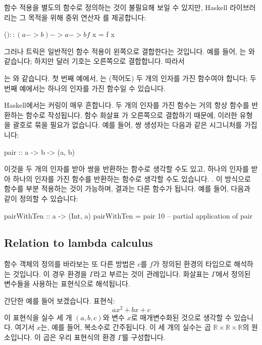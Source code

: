 \documentclass[DaoFP]{subfiles}
\begin{document}
\begin{CJK*}{UTF8}{gbsn}
함수 적용을 별도의 함수로 정의하는 것이 불필요해 보일 수 있지만, Haskell 라이브러리는 그 목적을 위해 중위 연산자 \hask{$}를 제공합니다:
\begin{haskell}
($) :: (a -> b) -> a -> b
f $ x = f x
\end{haskell}
그러나 트릭은 일반적인 함수 적용이 왼쪽으로 결합한다는 것입니다. 예를 들어, 는 와 같습니다; 하지만 달러 기호는 오른쪽으로 결합합니다. 따라서
는 와 같습니다. 첫 번째 예에서, 는 (적어도) 두 개의 인자를 가진 함수여야 합니다; 두 번째 예에서는 하나의 인자를 가진 함수일 수 있습니다.

Haskell에서는 커링이 매우 흔합니다. 두 개의 인자를 가진 함수는 거의 항상 함수를 반환하는 함수로 작성됩니다. 함수 화살표 \hask{->}가 오른쪽으로 결합하기 때문에, 이러한 유형을 괄호로 묶을 필요가 없습니다. 예를 들어, 쌍 생성자는 다음과 같은 시그니처를 가집니다:
\begin{haskell}
pair :: a -> b -> (a, b)
\end{haskell}
이것을 두 개의 인자를 받아 쌍을 반환하는 함수로 생각할 수도 있고, 하나의 인자를 받아 하나의 인자를 가진 함수를 반환하는 함수로 생각할 수도 있습니다. . 이 방식으로 함수를 부분 적용하는 것이 가능하며, 결과는 다른 함수가 됩니다. 예를 들어, 다음과 같이 정의할 수 있습니다:
\begin{haskell}
pairWithTen :: a -> (Int, a)
pairWithTen = pair 10 -- partial application of pair
\end{haskell}



\subsection{Relation to lambda calculus}

함수 객체의 정의를 바라보는 또 다른 방법은 $c$를 $f$가 정의된 환경의 타입으로 해석하는 것입니다. 이 경우 환경을 $\Gamma$라고 부르는 것이 관례입니다. 화살표는 $\Gamma$에서 정의된 변수들을 사용하는 표현식으로 해석됩니다.

간단한 예를 들어 보겠습니다. 표현식:
\[a x^2 + b x + c\]
이 표현식을 실수 세 개 $(a, b, c)$와 변수 $x$로 매개변수화된 것으로 생각할 수 있습니다. 여기서 $x$는, 예를 들어, 복소수로 간주됩니다. 이 세 개의 실수는 곱 $ \times {} \times {}$의 원소입니다. 이 곱은 우리 표현식의 환경 $\Gamma$를 구성합니다.


\end{CJK*}
\end{document}
